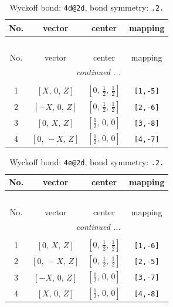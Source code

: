 \documentclass[fleqn,8pt]{jsarticle}
\begin{document}
\begin{longtable}{cccc}
\caption{Wyckoff bond: {\tt 4d@2d}, bond symmetry: {\tt .2.}}
 \\
 \hline \hline
No. & vector & center & mapping \\ \hline \endfirsthead

\multicolumn{3}{l}{\tablename\ \thetable{}} \\
 \hline \hline
No. & vector & center & mapping \\ \hline \endhead

 \hline \hline
\multicolumn{3}{r}{\footnotesize\it continued ...} \\ \endfoot

 \hline \hline
\multicolumn{3}{r}{} \\ \endlastfoot

1 & $\left[ X,\, 0,\, Z \right]$ & $\left[ 0,\, \frac{1}{2},\, \frac{1}{2} \right]$ & {\tt [1,-5]} \\ \hline
2 & $\left[ - X,\, 0,\, Z \right]$ & $\left[ 0,\, \frac{1}{2},\, \frac{1}{2} \right]$ & {\tt [2,-6]} \\ \hline
3 & $\left[ 0,\, X,\, Z \right]$ & $\left[ \frac{1}{2},\, 0,\, 0 \right]$ & {\tt [3,-8]} \\ \hline
4 & $\left[ 0,\, - X,\, Z \right]$ & $\left[ \frac{1}{2},\, 0,\, 0 \right]$ & {\tt [4,-7]} \\
\end{longtable}
\renewcommand{\arraystretch}{1.2}
\begin{longtable}{cccc}
\caption{Wyckoff bond: {\tt 4e@2d}, bond symmetry: {\tt .2.}}
 \\
 \hline \hline
No. & vector & center & mapping \\ \hline \endfirsthead

\multicolumn{3}{l}{\tablename\ \thetable{}} \\
 \hline \hline
No. & vector & center & mapping \\ \hline \endhead

 \hline \hline
\multicolumn{3}{r}{\footnotesize\it continued ...} \\ \endfoot

 \hline \hline
\multicolumn{3}{r}{} \\ \endlastfoot

1 & $\left[ 0,\, X,\, Z \right]$ & $\left[ 0,\, \frac{1}{2},\, \frac{1}{2} \right]$ & {\tt [1,-6]} \\ \hline
2 & $\left[ 0,\, - X,\, Z \right]$ & $\left[ 0,\, \frac{1}{2},\, \frac{1}{2} \right]$ & {\tt [2,-5]} \\ \hline
3 & $\left[ - X,\, 0,\, Z \right]$ & $\left[ \frac{1}{2},\, 0,\, 0 \right]$ & {\tt [3,-7]} \\ \hline
4 & $\left[ X,\, 0,\, Z \right]$ & $\left[ \frac{1}{2},\, 0,\, 0 \right]$ & {\tt [4,-8]} \\
\end{longtable}
\end{document}
